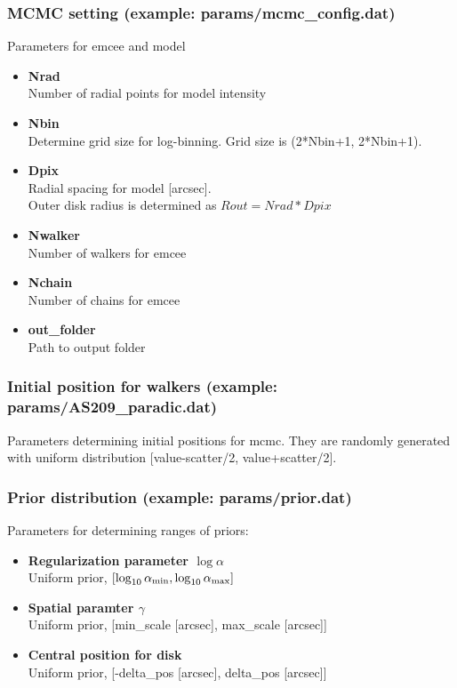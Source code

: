 \documentclass{report}
\begin{document}
\subsubsection{MCMC setting (example: params/mcmc\_config.dat) \label{sec:mcmc_config}}
Parameters for emcee and model
\begin{itemize}
    \item \textbf{Nrad} \\
    Number of radial points for model intensity
    \item \textbf{Nbin} \\
    Determine grid size for log-binning. Grid size is (2*Nbin+1, 2*Nbin+1). 
    \item \textbf{Dpix}\\
    Radial spacing for model [arcsec].\\ Outer disk radius is determined as $Rout = Nrad * Dpix$
    \item \textbf{Nwalker}\\
    Number of walkers for emcee
    \item \textbf{Nchain}\\
    Number of chains for emcee
    \item \textbf{out\_folder}\\
    Path to output folder
\end{itemize}

\subsubsection{Initial position for walkers (example: params/AS209\_paradic.dat)  \label{sec:initial_para}}
Parameters determining initial positions for mcmc. They are randomly generated with uniform distribution [value-scatter/2, value+scatter/2].

\subsubsection{Prior distribution (example: params/prior.dat)  \label{sec:prior_config}}
Parameters for determining ranges of priors: 
\begin{itemize}
    \item {\bf Regularization parameter $\log \alpha$}\\
    Uniform prior, $[\log_{10}\alpha_{\rm min}, \log_{10}\alpha_{\rm max}]$
    \item {\bf Spatial paramter $\gamma$} \\ Uniform prior, [min\_scale [arcsec], max\_scale [arcsec]]
    \item {\bf Central position for disk} \\ 
    Uniform prior,  [-delta\_pos [arcsec], delta\_pos [arcsec]]
\end{itemize}
\end{document}
